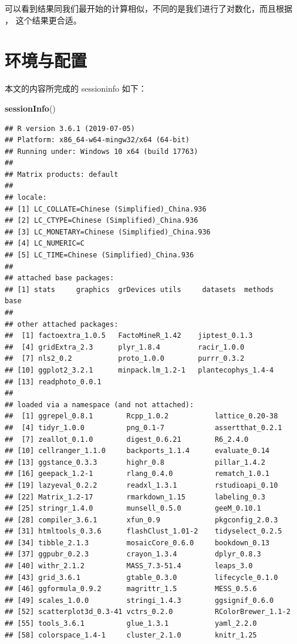 \documentclass[
]{krantz}
\makeatletter
\newenvironment{Shaded}{\begin{snugshade}}{\end{snugshade}}
\newcommand{\KeywordTok}[1]{\textcolor[rgb]{0.13,0.29,0.53}{\textbf{#1}}}
\newcommand{\NormalTok}[1]{#1}
\newenvironment{kframe}{%
\medskip{}
\setlength{\fboxsep}{.8em}
 \def\at@end@of@kframe{}%
 \ifinner\ifhmode%
  \def\at@end@of@kframe{\end{minipage}}%
  \begin{minipage}{\columnwidth}%
 \fi\fi%
 \def\FrameCommand##1{\hskip\@totalleftmargin \hskip-\fboxsep
 \colorbox{shadecolor}{##1}\hskip-\fboxsep
     \hskip-\linewidth \hskip-\@totalleftmargin \hskip\columnwidth}%
 \MakeFramed {\advance\hsize-\width
   \@totalleftmargin\z@ \linewidth\hsize
   \@setminipage}}%
 {\par\unskip\endMakeFramed%
 \at@end@of@kframe}
\renewenvironment{Shaded}{\begin{kframe}}{\end{kframe}}
\makeatother
\begin{document}
可以看到结果同我们最开始的计算相似，不同的是我们进行了对数化，而且根据 \citet{kemp2003modern}， 这个结果更合适。

\hypertarget{sessioninfo}{%
\chapter{环境与配置}\label{sessioninfo}}

本文的内容所完成的 sessioninfo 如下：

\begin{Shaded}
\begin{Highlighting}[]
\KeywordTok{sessionInfo}\NormalTok{()}
\end{Highlighting}
\end{Shaded}

\begin{verbatim}
## R version 3.6.1 (2019-07-05)
## Platform: x86_64-w64-mingw32/x64 (64-bit)
## Running under: Windows 10 x64 (build 17763)
## 
## Matrix products: default
## 
## locale:
## [1] LC_COLLATE=Chinese (Simplified)_China.936 
## [2] LC_CTYPE=Chinese (Simplified)_China.936   
## [3] LC_MONETARY=Chinese (Simplified)_China.936
## [4] LC_NUMERIC=C                              
## [5] LC_TIME=Chinese (Simplified)_China.936    
## 
## attached base packages:
## [1] stats     graphics  grDevices utils     datasets  methods   base     
## 
## other attached packages:
##  [1] factoextra_1.0.5   FactoMineR_1.42    jiptest_0.1.3     
##  [4] gridExtra_2.3      plyr_1.8.4         racir_1.0.0       
##  [7] nls2_0.2           proto_1.0.0        purrr_0.3.2       
## [10] ggplot2_3.2.1      minpack.lm_1.2-1   plantecophys_1.4-4
## [13] readphoto_0.0.1   
## 
## loaded via a namespace (and not attached):
##  [1] ggrepel_0.8.1        Rcpp_1.0.2           lattice_0.20-38     
##  [4] tidyr_1.0.0          png_0.1-7            assertthat_0.2.1    
##  [7] zeallot_0.1.0        digest_0.6.21        R6_2.4.0            
## [10] cellranger_1.1.0     backports_1.1.4      evaluate_0.14       
## [13] ggstance_0.3.3       highr_0.8            pillar_1.4.2        
## [16] geepack_1.2-1        rlang_0.4.0          rematch_1.0.1       
## [19] lazyeval_0.2.2       readxl_1.3.1         rstudioapi_0.10     
## [22] Matrix_1.2-17        rmarkdown_1.15       labeling_0.3        
## [25] stringr_1.4.0        munsell_0.5.0        geeM_0.10.1         
## [28] compiler_3.6.1       xfun_0.9             pkgconfig_2.0.3     
## [31] htmltools_0.3.6      flashClust_1.01-2    tidyselect_0.2.5    
## [34] tibble_2.1.3         mosaicCore_0.6.0     bookdown_0.13       
## [37] ggpubr_0.2.3         crayon_1.3.4         dplyr_0.8.3         
## [40] withr_2.1.2          MASS_7.3-51.4        leaps_3.0           
## [43] grid_3.6.1           gtable_0.3.0         lifecycle_0.1.0     
## [46] ggformula_0.9.2      magrittr_1.5         MESS_0.5.6          
## [49] scales_1.0.0         stringi_1.4.3        ggsignif_0.6.0      
## [52] scatterplot3d_0.3-41 vctrs_0.2.0          RColorBrewer_1.1-2  
## [55] tools_3.6.1          glue_1.3.1           yaml_2.2.0          
## [58] colorspace_1.4-1     cluster_2.1.0        knitr_1.25
\end{verbatim}

\cleardoublepage

  

\backmatter
\printindex
\end{document}
